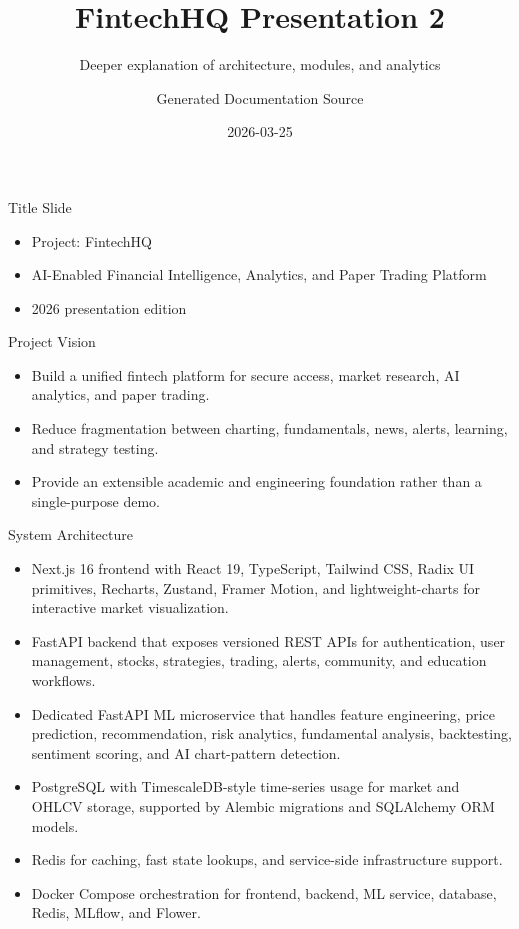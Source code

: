 \documentclass{beamer}
\title{FintechHQ Presentation 2}
\subtitle{Deeper explanation of architecture, modules, and analytics}
\author{Generated Documentation Source}
\date{2026-03-25}
\begin{document}
\begin{frame}
\titlepage
\end{frame}
\begin{frame}{Title Slide}
\begin{itemize}
\item Project: FintechHQ
\item AI-Enabled Financial Intelligence, Analytics, and Paper Trading Platform
\item 2026 presentation edition
\end{itemize}
\end{frame}
\begin{frame}{Project Vision}
\begin{itemize}
\item Build a unified fintech platform for secure access, market research, AI analytics, and paper trading.
\item Reduce fragmentation between charting, fundamentals, news, alerts, learning, and strategy testing.
\item Provide an extensible academic and engineering foundation rather than a single-purpose demo.
\end{itemize}
\end{frame}
\begin{frame}{System Architecture}
\begin{itemize}
\item Next.js 16 frontend with React 19, TypeScript, Tailwind CSS, Radix UI primitives, Recharts, Zustand, Framer Motion, and lightweight-charts for interactive market visualization.
\item FastAPI backend that exposes versioned REST APIs for authentication, user management, stocks, strategies, trading, alerts, community, and education workflows.
\item Dedicated FastAPI ML microservice that handles feature engineering, price prediction, recommendation, risk analytics, fundamental analysis, backtesting, sentiment scoring, and AI chart-pattern detection.
\item PostgreSQL with TimescaleDB-style time-series usage for market and OHLCV storage, supported by Alembic migrations and SQLAlchemy ORM models.
\item Redis for caching, fast state lookups, and service-side infrastructure support.
\item Docker Compose orchestration for frontend, backend, ML service, database, Redis, MLflow, and Flower.
\end{itemize}
\end{frame}
\end{document}
